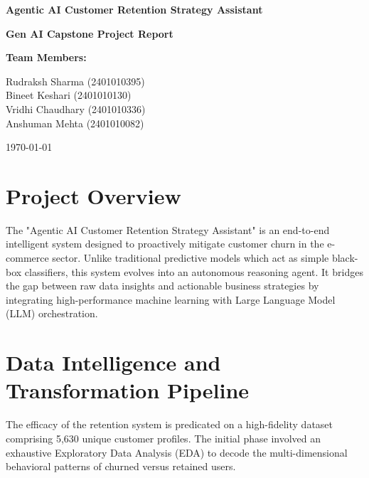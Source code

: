 \documentclass[a4paper,12pt]{article}
\begin{document}
\begin{titlepage}
    \centering
    \vspace*{2cm}
    {\Huge \textbf{Agentic AI Customer Retention Strategy Assistant} \par}
    \vspace{1.5cm}
    {\Large \textbf{Gen AI Capstone Project Report} \par}
    \vspace{3cm}
    
    {\Large \textbf{Team Members:} \par}
    \vspace{1cm}
    {\large
    Rudraksh Sharma (2401010395) \\
    Bineet Keshari (2401010130) \\
    Vridhi Chaudhary (2401010336) \\
    Anshuman Mehta (2401010082)
    \par}
    
    \vfill
    {\large \today \par}
\end{titlepage}

\newpage
\tableofcontents
\newpage

\section{Project Overview}
The "Agentic AI Customer Retention Strategy Assistant" is an end-to-end intelligent system designed to proactively mitigate customer churn in the e-commerce sector. Unlike traditional predictive models which act as simple black-box classifiers, this system evolves into an autonomous reasoning agent. It bridges the gap between raw data insights and actionable business strategies by integrating high-performance machine learning with Large Language Model (LLM) orchestration.

\section{Data Intelligence and Transformation Pipeline}
The efficacy of the retention system is predicated on a high-fidelity dataset comprising 5,630 unique customer profiles. The initial phase involved an exhaustive Exploratory Data Analysis (EDA) to decode the multi-dimensional behavioral patterns of churned versus retained users.
\end{document}
